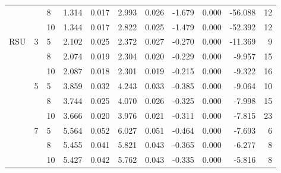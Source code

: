 \begin{tabular}{lllrrrrrrrr}
    &   & 8  &  1.314 &     0.017 &  2.993 &     0.026 &     -1.679 &   0.000 &   -56.088 &  12 \\
    &   & 10 &  1.344 &     0.017 &  2.822 &     0.025 &     -1.479 &   0.000 &   -52.392 &  12 \\
RSU & 3 & 5  &  2.102 &     0.025 &  2.372 &     0.027 &     -0.270 &   0.000 &   -11.369 &   9 \\
    &   & 8  &  2.074 &     0.019 &  2.304 &     0.020 &     -0.229 &   0.000 &    -9.957 &  15 \\
    &   & 10 &  2.087 &     0.018 &  2.301 &     0.019 &     -0.215 &   0.000 &    -9.322 &  16 \\
    & 5 & 5  &  3.859 &     0.032 &  4.243 &     0.033 &     -0.385 &   0.000 &    -9.064 &  10 \\
    &   & 8  &  3.744 &     0.025 &  4.070 &     0.026 &     -0.325 &   0.000 &    -7.998 &  15 \\
    &   & 10 &  3.666 &     0.020 &  3.976 &     0.021 &     -0.311 &   0.000 &    -7.815 &  23 \\
    & 7 & 5  &  5.564 &     0.052 &  6.027 &     0.051 &     -0.464 &   0.000 &    -7.693 &   6 \\
    &   & 8  &  5.455 &     0.041 &  5.821 &     0.043 &     -0.365 &   0.000 &    -6.277 &   8 \\
    &   & 10 &  5.427 &     0.042 &  5.762 &     0.043 &     -0.335 &   0.000 &    -5.816 &   8 \\
\bottomrule
\end{tabular}
